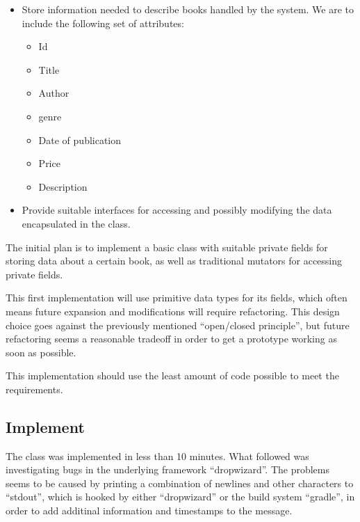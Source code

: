 \begin{itemize}
  \item Store information needed to describe books handled by the system.
        We are to include the following set of attributes:

  \begin{itemize}
    \item Id
    \item Title
    \item Author
    \item genre
    \item Date of publication
    \item Price
    \item Description
  \end{itemize}

  \item Provide suitable interfaces for accessing and possibly modifying the
        data encapsulated in the class.
\end{itemize}

The initial plan is to implement a basic class with suitable private fields for
storing data about a certain book, as well as traditional mutators for
accessing private fields.

This first implementation will use primitive data types for its fields, which
often means future expansion and modifications will require refactoring.
This design choice goes against the previously mentioned ``open/closed
principle'', but future refactoring seems a reasonable tradeoff in order to get
a prototype working as soon as possible.

This implementation should use the least amount of code possible to meet the
requirements.


\subsection{Implement}\label{task-1a-implement}
The class was implemented in less than 10 minutes. What followed was
investigating bugs in the underlying framework ``dropwizard''\cite{framework:dropwizard}.
The problems seems to be caused by printing a combination of newlines and other
characters to ``stdout'', which is hooked by either ``dropwizard'' or the build
system ``gradle''\cite{tool:gradle}, in order to add additinal information and
timestamps to the message.


